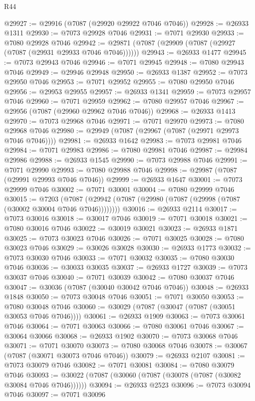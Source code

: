\begin{lexlean}{R44}
\begin{coremodule}
{@29927 := @29916 (@7087 (@29920 @29922 @7046 @7046))
@29928 := @26933 @1311
@29930 := @7073 @29928 @7046
@29931 := @7071 @29930
@29933 := @7080 @29928 @7046
@29942 := @29871 (@7087 (@29909 (@7087 (@29927 (@7087 (@29931 @29933 @7046 @7046))))))
@29943 := @26933 @1477
@29945 := @7073 @29943 @7046
@29946 := @7071 @29945
@29948 := @7080 @29943 @7046
@29949 := @29946 @29948
@29950 := @26933 @1387
@29952 := @7073 @29950 @7046
@29953 := @7071 @29952
@29955 := @7080 @29950 @7046
@29956 := @29953 @29955
@29957 := @26933 @1341
@29959 := @7073 @29957 @7046
@29960 := @7071 @29959
@29962 := @7080 @29957 @7046
@29967 := @29956 (@7087 (@29960 @29962 @7046 @7046))
@29968 := @26933 @1413
@29970 := @7073 @29968 @7046
@29971 := @7071 @29970
@29973 := @7080 @29968 @7046
@29980 := @29949 (@7087 (@29967 (@7087 (@29971 @29973 @7046 @7046))))
@29981 := @26933 @1642
@29983 := @7073 @29981 @7046
@29984 := @7071 @29983
@29986 := @7080 @29981 @7046
@29987 := @29984 @29986
@29988 := @26933 @1545
@29990 := @7073 @29988 @7046
@29991 := @7071 @29990
@29993 := @7080 @29988 @7046
@29998 := @29987 (@7087 (@29991 @29993 @7046 @7046))
@29999 := @26933 @1647
@30001 := @7073 @29999 @7046
@30002 := @7071 @30001
@30004 := @7080 @29999 @7046
@30015 := @7203
    (@7087 (@29942 (@7087 (@29980 (@7087 (@29998 (@7087 (@30002 @30004 @7046 @7046))))))))
@30016 := @26933 @2114
@30017 := @7073 @30016
@30018 := @30017 @7046
@30019 := @7071 @30018
@30021 := @7080 @30016 @7046
@30022 := @30019 @30021
@30023 := @26933 @1871
@30025 := @7073 @30023 @7046
@30026 := @7071 @30025
@30028 := @7080 @30023 @7046
@30029 := @30026 @30028
@30030 := @26933 @1773
@30032 := @7073 @30030 @7046
@30033 := @7071 @30032
@30035 := @7080 @30030 @7046
@30036 := @30033 @30035
@30037 := @26933 @1727
@30039 := @7073 @30037 @7046
@30040 := @7071 @30039
@30042 := @7080 @30037 @7046
@30047 := @30036 (@7087 (@30040 @30042 @7046 @7046))
@30048 := @26933 @1848
@30050 := @7073 @30048 @7046
@30051 := @7071 @30050
@30053 := @7080 @30048 @7046
@30060 := @30029 (@7087 (@30047 (@7087 (@30051 @30053 @7046 @7046))))
@30061 := @26933 @1909
@30063 := @7073 @30061 @7046
@30064 := @7071 @30063
@30066 := @7080 @30061 @7046
@30067 := @30064 @30066
@30068 := @26933 @1902
@30070 := @7073 @30068 @7046
@30071 := @7071 @30070
@30073 := @7080 @30068 @7046
@30078 := @30067 (@7087 (@30071 @30073 @7046 @7046))
@30079 := @26933 @2107
@30081 := @7073 @30079 @7046
@30082 := @7071 @30081
@30084 := @7080 @30079 @7046
@30093 := @30022 (@7087 (@30060 (@7087 (@30078 (@7087 (@30082 @30084 @7046 @7046))))))
@30094 := @26933 @2523
@30096 := @7073 @30094 @7046
@30097 := @7071 @30096
}
\end{coremodule}
\end{lexlean}

